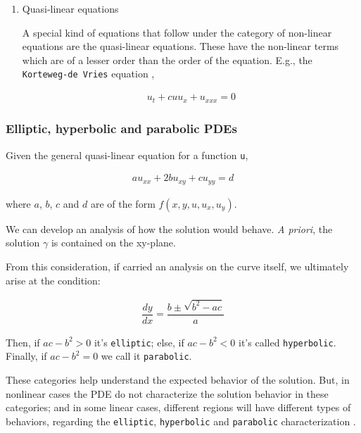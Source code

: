 \documentclass[12pt]{article}
\begin{document}
\begin{enumerate}
\item Quasi-linear equations
\label{sec:org582f9ae}

A special kind of equations that follow under the category of non-linear
equations are the quasi-linear equations. These have the non-linear terms which
are of a lesser order than the order of the equation. E.g., the \texttt{Korteweg-de
Vries} equation \cite{john1978partial},

\begin{equation}
\begin{aligned}
u_t + c uu_{x} + u_{xxx} = 0
\end{aligned}
\end{equation}
\end{enumerate}

\subsubsection{Elliptic, hyperbolic and parabolic PDEs}
\label{sec:org9046ac6}
Given the general quasi-linear equation for a function \texttt{u},

\begin{equation}
\label{eq:general-2th-order}
\begin{aligned}
au_{xx} + 2bu_{xy} + cu_{yy} = d
\end{aligned}
\end{equation}

where \(a\), \(b\), \(c\) and \(d\) are of the form \(f(x,y,u,u_x,u_y)\).

We can develop an analysis of how the solution would behave. \emph{A priori}, the
solution \(\gamma\) is contained on the xy-plane.

From this consideration, if carried an analysis on the curve itself, we
ultimately arise at the condition:

\begin{equation}
\begin{aligned}
\dfrac{dy}{dx} = \dfrac{b \pm \sqrt{b^2 -ac}}{a}
\end{aligned}
\end{equation}

Then, if \(ac-b^2>0\) it's \texttt{elliptic}; else, if \(ac-b^2<0\) it's called
\texttt{hyperbolic}. Finally, if \(ac-b^2=0\) we call it \texttt{parabolic}.

These categories help understand the expected behavior of the solution. But, in
nonlinear cases the PDE do not characterize the solution behavior in these
categories; and in some linear cases, different regions will have different
types of behaviors, regarding the \texttt{elliptic}, \texttt{hyperbolic} and \texttt{parabolic}
characterization \cite{john1978partial}.
\end{document}
